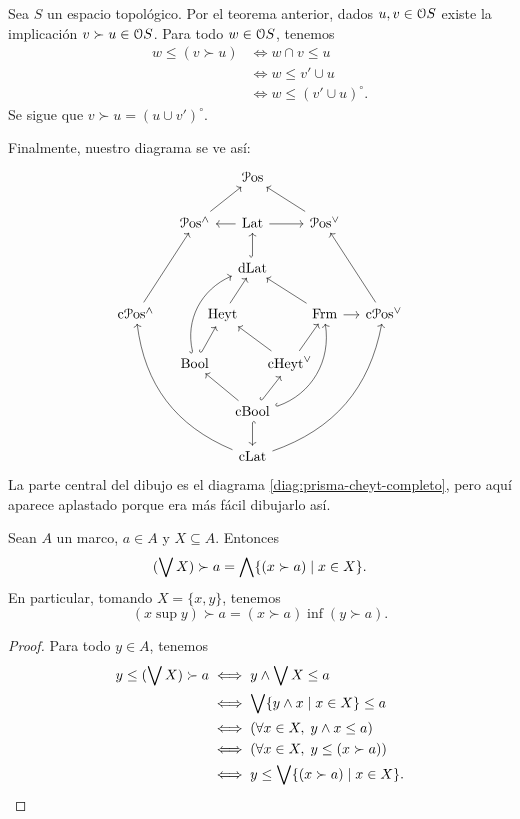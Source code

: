 \begin{example}
  Sea $S$ un espacio topológico.
  Por el teorema anterior, dados $u,v\in\cal OS$
  existe la implicación $v\succ u\in \cal OS$.
  Para todo $w\in\cal OS$, tenemos
  \begin{align*}
    w\leq (v\succ u)
    &\iff w\cap v\leq u \\
    &\iff w\leq v'\cup u \\
    &\iff w\leq (v'\cup u)^\circ.
  \end{align*}
  Se sigue que $v\succ u = (u\cup v')^\circ$.
\end{example}

Finalmente, nuestro diagrama se ve así:
\[
  \begin{tikzcd}[column sep = -1em]
      &[2em] & & \Pos & & &[2em] \\
      & \Pos^\wedge \ar[rru]
        && \Lat \ar[ll] \ar[rr]
        && \Pos^\sup  \ar[llu] & \\
      & & & \DLat \ar[u,hook] & & & \\
        \InfLat \ar[ruu]
        && \Heyt \ar[ur]
        &&& \Frm \ar[r] \ar[llu]
        & \SupLat \ar[luu] \\
      & \Bool \ar[rruu,hook,bend left=40] \ar[ur,hook]
      & & & \cHeyt \ar[ur] \ar[llu] & & \\
      & & & \CBA \ar[d,hook] \ar[ull] \ar[ur,hook]
                \ar[uurr,hook,bend right=40]
      & & & \\
      & & & \CLat \ar[rrruuu,bend right]
                  \ar[llluuu,bend left] & &
  \end{tikzcd}
\]
La parte central del dibujo es el diagrama
\eqref{diag:prisma-cheyt-completo}, pero aquí aparece aplastado porque
era más fácil dibujarlo así.

\begin{lemma}
    Sean $A$ un marco, $a\in A$ y $X\subseteq A$.
    Entonces
    \[
        (\Sup X)\succ a = \Inf\{(x\succ a) \mid x\in X\}
    .\]
    En particular, tomando $X=\{x,y\}$, tenemos
    \[
        (x\sup y)\succ a = (x\succ a)\inf(y\succ a)
    .\]
\end{lemma}
\begin{proof}
    Para todo $y\in A$, tenemos
    \begin{align*}
        y\leq (\Sup X)\succ a
        &\iff y\inf \Sup X \leq a \\
        &\iff \Sup\{y\inf x\mid x\in X\} \leq a \\
        &\iff (\forall x\in X,\; y\inf x\leq a) \\
        &\iff (\forall x\in X,\; y\leq(x\succ a)) \\
        &\iff y\leq \Sup\{(x\succ a)\mid x\in X\}.
    \end{align*}
\end{proof}


